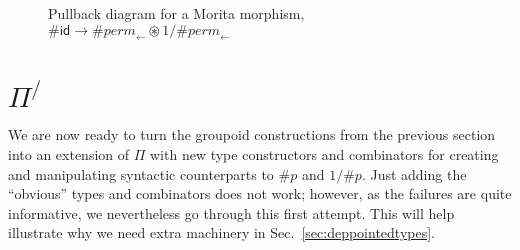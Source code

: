 \documentclass[a4paper,USenglish]{lipics-v2016-utf8x}
\newcommand{\hash}{\#}
\newcommand{\order}[1]{\hash #1}
\newcommand{\iorder}[1]{1/\hash #1}
\newcommand{\ot}{\mathbb{1}}
\newcommand{\permfive}{\mathit{perm}_{\leftarrow}}
\newcommand{\idiso}{\mathsf{{id}}}
\begin{document}
\begin{figure}[h]
  \centering
  \caption{
    \label{fig:morita}
    Pullback diagram for a Morita morphism,
    $\order{\idiso} \rightarrow \order{\permfive} \circledast
    \iorder{\permfive}$
  }
\end{figure}

\section{$\Pi^/$}

We are now ready to turn the groupoid constructions from the previous section
into an extension of $\Pi$ with new type constructors and combinators for
creating and manipulating syntactic counterparts to $\order{p}$ and
$\iorder{p}$.  Just adding the ``obvious'' types and combinators does
not work; however, as the failures are quite informative, we nevertheless go
through this first attempt.  This will help illustrate why we need extra
machinery in Sec.~\ref{sec:deppointedtypes}.
\end{document}
